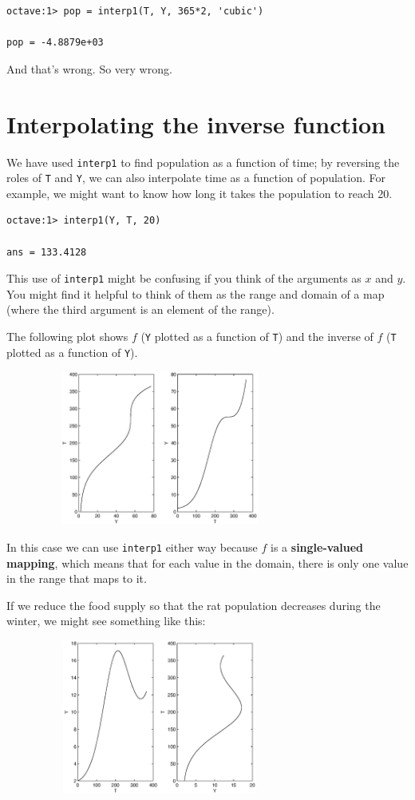 \documentclass{book}
\begin{document}
\begin{verbatim}
octave:1> pop = interp1(T, Y, 365*2, 'cubic')

pop = -4.8879e+03
\end{verbatim}

And that's wrong. So very wrong.


\section{Interpolating the inverse function}

We have used {\tt interp1} to find population as a function of time;
by reversing the roles of {\tt T} and {\tt Y}, we can also interpolate
time as a function of population. For example, we might want to know
how long it takes the population to reach 20.

\begin{verbatim}
octave:1> interp1(Y, T, 20)

ans = 133.4128
\end{verbatim}

This use of {\tt interp1} might be confusing if you think of the
arguments as $x$ and $y$. You might find it helpful to think of them
as the range and domain of a map (where the third argument is
an element of the range).

The following plot shows $f$ ({\tt Y} plotted as a function of {\tt T})
and the inverse of $f$ ({\tt T} plotted as a function of {\tt Y}).

\beforefig
\centerline{\includegraphics[height=2in,width=4in]{figs/ratplot.eps}}

In this case we can use {\tt interp1} either way because $f$ is
a {\bf single-valued mapping}, which means that for each value in
the domain, there is only one value in the range that maps to it.

If we reduce the food supply so that the rat population decreases
during the winter, we might see something like this:

\beforefig 
\centerline{\includegraphics[height=2in,width=4in]{figs/ratplot2.eps}}
\end{document}
